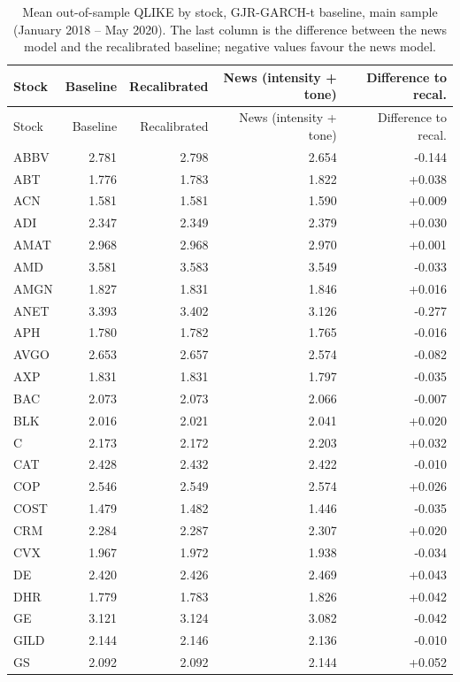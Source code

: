 \documentclass[12pt,a4paper]{article}
\begin{document}
\begin{longtable}{lrrrr}
\caption[Out-of-sample QLIKE by stock, main sample]{Mean out-of-sample QLIKE by stock, GJR-GARCH-t baseline, main sample (January 2018 -- May 2020). The last column is the difference between the news model and the recalibrated baseline; negative values favour the news model.}\label{tab:app-stock-oos}\\
\toprule
Stock & Baseline & Recalibrated & News (intensity + tone) & Difference to recal. \\
\midrule
\endfirsthead
\toprule
Stock & Baseline & Recalibrated & News (intensity + tone) & Difference to recal. \\
\midrule
\endhead
\bottomrule
\endfoot
ABBV & 2.781 & 2.798 & 2.654 & -0.144 \\
ABT & 1.776 & 1.783 & 1.822 & +0.038 \\
ACN & 1.581 & 1.581 & 1.590 & +0.009 \\
ADI & 2.347 & 2.349 & 2.379 & +0.030 \\
AMAT & 2.968 & 2.968 & 2.970 & +0.001 \\
AMD & 3.581 & 3.583 & 3.549 & -0.033 \\
AMGN & 1.827 & 1.831 & 1.846 & +0.016 \\
ANET & 3.393 & 3.402 & 3.126 & -0.277 \\
APH & 1.780 & 1.782 & 1.765 & -0.016 \\
AVGO & 2.653 & 2.657 & 2.574 & -0.082 \\
AXP & 1.831 & 1.831 & 1.797 & -0.035 \\
BAC & 2.073 & 2.073 & 2.066 & -0.007 \\
BLK & 2.016 & 2.021 & 2.041 & +0.020 \\
C & 2.173 & 2.172 & 2.203 & +0.032 \\
CAT & 2.428 & 2.432 & 2.422 & -0.010 \\
COP & 2.546 & 2.549 & 2.574 & +0.026 \\
COST & 1.479 & 1.482 & 1.446 & -0.035 \\
CRM & 2.284 & 2.287 & 2.307 & +0.020 \\
CVX & 1.967 & 1.972 & 1.938 & -0.034 \\
DE & 2.420 & 2.426 & 2.469 & +0.043 \\
DHR & 1.779 & 1.783 & 1.826 & +0.042 \\
GE & 3.121 & 3.124 & 3.082 & -0.042 \\
GILD & 2.144 & 2.146 & 2.136 & -0.010 \\
GS & 2.092 & 2.092 & 2.144 & +0.052 \\

\end{longtable}
\end{document}
